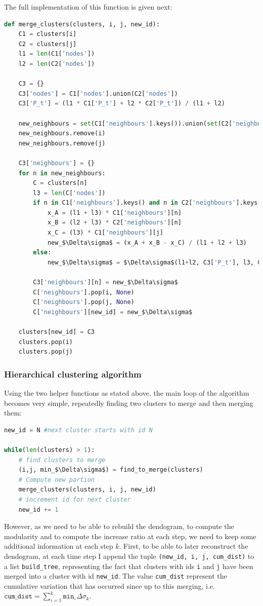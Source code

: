 \documentclass[12pt]{article}
\theoremstyle{definition}
\begin{document}
The full implementation of this function is given next:
\begin{lstlisting}[language=Python, mathescape]
def merge_clusters(clusters, i, j, new_id):
    C1 = clusters[i]
    C2 = clusters[j]    
    l1 = len(C1['nodes'])
    l2 = len(C2['nodes'])
    
    C3 = {}
    C3['nodes'] = C1['nodes'].union(C2['nodes'])
    C3['P_t'] = (l1 * C1['P_t'] + l2 * C2['P_t']) / (l1 + l2)

    new_neighbours = set(C1['neighbours'].keys()).union(set(C2['neighbours'].keys()))
    new_neighbours.remove(i)
    new_neighbours.remove(j)
    
    C3['neighbours'] = {}
    for n in new_neighbours:
        C = clusters[n]
        l3 = len(C['nodes'])
        if n in C1['neighbours'].keys() and n in C2['neighbours'].keys():
            x_A = (l1 + l3) * C1['neighbours'][n]
            x_B = (l2 + l3) * C2['neighbours'][n]
            x_C = (l3) * C1['neighbours'][j]
            new_$\Delta\sigma$ = (x_A + x_B - x_C) / (l1 + l2 + l3)
        else:
            new_$\Delta\sigma$ = $\Delta\sigma$(l1+l2, C3['P_t'], l3, C['P_t'])
        
        C3['neighbours'][n] = new_$\Delta\sigma$
        C['neighbours'].pop(i, None)
        C['neighbours'].pop(j, None)
        C['neighbours'][new_id] = new_$\Delta\sigma$
    
    clusters[new_id] = C3
    clusters.pop(i)
    clusters.pop(j)
\end{lstlisting}
    
\subsubsection{Hierarchical clustering algorithm}
Using the two helper functions as stated above, the main loop of the algorithm becomes very simple, repeatedly finding two clusters to merge and then merging them:
\begin{lstlisting}[language=Python, mathescape]
new_id = N #next cluster starts with id N

while(len(clusters) > 1):    
    # find clusters to merge
    (i,j, min_$\Delta\sigma$) = find_to_merge(clusters)
    # Compute new partion
    merge_clusters(clusters, i, j, new_id)
    # increment id for next cluster
    new_id += 1
\end{lstlisting}
However, as we need to be able to rebuild the dendogram, to compute the modularity and to compute the increase ratio at each step, we need to keep some additional information at each step $k$. First, to be able to later reconstruct the dendogram, at each time step I append the tuple \texttt{(new\_id, i, j, cum\_dist)}  to a list \texttt{build\_tree}, representing the fact that clusters with ids \texttt{i} and \texttt{j} have been merged into a cluster with id \texttt{new\_id}. The value \texttt{cum\_dist} represent the cumulative variation that has occurred since up to this merging, i.e.\ $\texttt{cum\_dist} = \sum_{i=1}^k \texttt{min\_}\Delta\sigma_k$.
\end{document}
